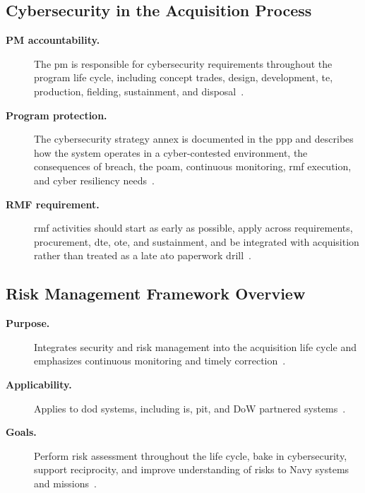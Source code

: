 \documentclass[../main.tex]{subfiles}
\begin{document}
\subsection{Cybersecurity in the Acquisition Process}
\begin{description}
  \item[\textbf{PM accountability.}] The \ac{pm} is responsible for cybersecurity requirements throughout the program life cycle, including concept trades, design, development, \ac{te}, production, fielding, sustainment, and disposal~\autocite{DoDI5000-90,edo-3-4-3-cybersecurity-awareness-2025}.
  \item[\textbf{Program protection.}] The cybersecurity strategy annex is documented in the \ac{ppp} and describes how the system operates in a cyber-contested environment, the consequences of breach, the \ac{poam}, continuous monitoring, \ac{rmf} execution, and cyber resiliency needs~\autocite{DoDI5000-90,edo-3-4-3-cybersecurity-awareness-2025}.
  \item[\textbf{RMF requirement.}] \ac{rmf} activities should start as early as possible, apply across requirements, procurement, \ac{dte}, \ac{ote}, and sustainment, and be integrated with acquisition rather than treated as a late \ac{ato} paperwork drill~\autocite{DoDI8510-01,DoDI5000-90,edo-3-4-3-cybersecurity-awareness-2025}.
\end{description}

\subsection{Risk Management Framework Overview}
\begin{description}
  \item[\textbf{Purpose.}] Integrates security and risk management into the acquisition life cycle and emphasizes continuous monitoring and timely correction~\autocite{DoDI8510-01,edo-3-4-3-cybersecurity-awareness-2025}.
  \item[\textbf{Applicability.}] Applies to \ac{dod} systems, including \ac{is}, \ac{pit}, and DoW partnered systems~\autocite{DoDI8510-01,DoDI8500-01,edo-3-4-3-cybersecurity-awareness-2025}.
  \item[\textbf{Goals.}] Perform risk assessment throughout the life cycle, bake in cybersecurity, support reciprocity, and improve understanding of risks to Navy systems and missions~\autocite{DoDI8510-01,edo-3-4-3-cybersecurity-awareness-2025}.
\end{description}
\end{document}
